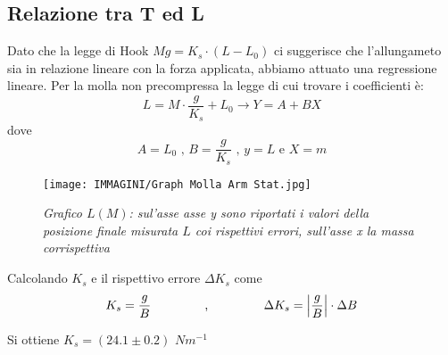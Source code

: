 \documentclass[12pt, a4paper]{article}
\begin{document}
\subsection{Relazione tra T ed L}
Dato che la legge di Hook $Mg=K_s\cdot(L-L_0)$ ci suggerisce che l'allungameto sia in relazione lineare con la forza applicata, abbiamo attuato una regressione lineare. 
Per la molla non precompressa la legge di cui trovare i coefficienti è: 
\begin{equation*}
    L=M\cdot\displaystyle\frac{g}{K_s}+L_0
    \xrightarrow{} Y = A + BX
\end{equation*} 
dove\\ 
\begin{equation*}
 A= L_0 \mbox{ , } B=\displaystyle\frac{g}{K_s} \mbox{ , } y = L \mbox{ e } X = m
\end{equation*}



\begin{figure}[h]
\texttt{[image: IMMAGINI/Graph Molla Arm Stat.jpg]}
\centering
\caption{\textit{{\footnotesize{Grafico $L(M)$}: sul'asse asse \textit{y} sono riportati i valori della posizione finale misurata $L$ coi rispettivi errori, sull'asse \textit{x} la massa corrispettiva}}}
\label{Grafico parabolico}
\end{figure}


\bigskip
\bigskip


Calcolando $K_s$ e il rispettivo errore $\Delta K_s$ come\\

\begin{equation*}
\centering
    K_s= \frac{g}{B} \text{\phantom{Testo invi}} \text{,} \text{\phantom{Testo sibil}} \Delta K_s = \left | \frac{g}{B}  \right | \cdot \Delta B 
\end{equation*}
\bigskip

Si ottiene $K_s = (24.1 \pm 0.2)$ $N m^{-1}$
\end{document}
